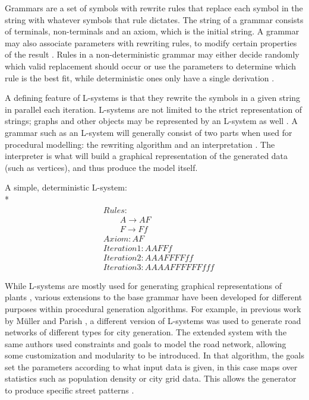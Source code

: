 Grammars are a set of symbols with rewrite rules that replace each symbol in the string with whatever symbols that rule dictates. The string of a grammar consists of terminals, non-terminals and an axiom, which is the initial string. A grammar may also associate parameters with rewriting rules, to modify certain properties of the result \cite{graphical_l-systems}. Rules in a non-deterministic grammar may either decide randomly which valid replacement should occur or use the parameters to determine which rule is the best fit, while deterministic ones only have a single derivation \cite[p. 75]{shaker2016procedural}. 

A defining feature of L-systems is that they rewrite the symbols in a given string in parallel each iteration. L-systems are not limited to the strict representation of strings; graphs and other objects may be represented by an L-system as well \cite[p. 75-79]{shaker2016procedural}. A grammar such as an L-system will generally consist of two parts when used for procedural modelling: the rewriting algorithm and an interpretation \cite{graphical_l-systems}. The interpreter is what will build a graphical representation of the generated data (such as vertices), and thus produce the model itself.

A simple, deterministic L-system: \\*
\begin{align*}
    &Rules: \\
    &\qquad A \to AF \\
    &\qquad F \to Ff \\\
    &Axiom: AF \\\
    &Iteration 1: 	AAFFf \\
    &Iteration 2: 	AAAFFFFff \\
    &Iteration 3: 	AAAAFFFFFFfff
\end{align*}

While L-systems are mostly used for generating graphical representations of plants \cite{SpeedTree}, various extensions to the base grammar have been developed for different purposes within procedural generation algorithms. For example, in previous work by Müller and Parish \cite{yoav-pascal}, a different version of L-systems was used to generate road networks of different types for city generation. The extended system with the same authors used constraints and goals to model the road network, allowing some customization and modularity to be introduced. In that algorithm, the goals set the parameters according to what input data is given, in this case maps over statistics such as population density or city grid data. This allows the generator to produce specific street patterns \cite{yoav-pascal}.

